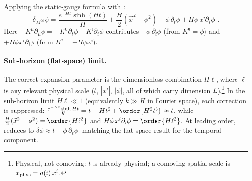 \documentclass[11pt]{article}
\begin{document}
Applying the static-gauge formula  with :
\begin{equation}
\label{eq:delta-phi-temporal}
\delta_{M^{0\phi}}\phi
= \frac{e^{-Ht}\sinh(Ht)}{H} + \frac{H}{2}\!\left(\vec{x}^2 - \phi^2\right)
- \phi\,\partial_t\phi + H\phi\, x^i\partial_i\phi \,\,.
\end{equation}
Here $-K^\mu\partial_\mu\phi = -K^0\partial_t\phi - K^i\partial_i\phi$
contributes $-\phi\,\partial_t\phi$ (from $K^0 = \phi$) and $+H\phi x^i\partial_i\phi$
(from $K^i = -H\phi x^i$).

\paragraph{Sub-horizon (flat-space) limit.}
The correct expansion parameter is the dimensionless combination $H\ell$, where $\ell$ is any
relevant physical scale ($t$, $|x^i|$, $|\phi|$, all of which carry dimension
$L$).\footnote{Physical, not comoving: $t$ is already physical; a comoving spatial scale is
$x_{\rm phys}=a(t)\,x^i$.}  In the sub-horizon
limit $H\ell \ll 1$ (equivalently $k \gg H$ in Fourier space), each correction is suppressed:
$\frac{e^{-Ht}\sinh Ht}{H} = t - Ht^2 + \order{H^2 t^3} \approx t$,
while $\frac{H}{2}(\vec{x}^2-\phi^2) = \order{H\ell^2}$ and $H\phi\,x^i\partial_i\phi = \order{H\ell^2}$.
At leading order,  reduces to $\delta\phi \approx t - \phi\,\partial_t\phi$,
matching the flat-space result  for the temporal component.
\end{document}
